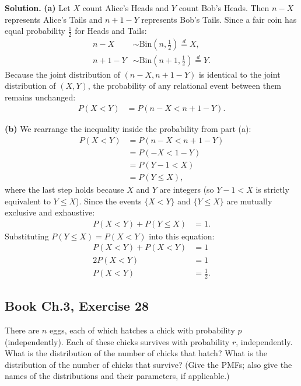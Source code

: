 \documentclass[11pt,a4paper]{article}
\begin{document}
\noindent \textbf{Solution.} \textbf{(a)} Let $X$ count Alice's Heads and $Y$ count Bob's Heads. Then $n - X$ represents Alice's Tails and $n + 1 - Y$ represents Bob's Tails. Since a fair coin has equal probability $\frac{1}{2}$ for Heads and Tails:
\begin{align*}
n - X &\sim \text{Bin}\left(n, \frac{1}{2}\right) \stackrel{d}{=} X, \\
n + 1 - Y &\sim \text{Bin}\left(n+1, \frac{1}{2}\right) \stackrel{d}{=} Y.
\end{align*}
Because the joint distribution of $(n-X, n+1-Y)$ is identical to the joint distribution of $(X, Y)$, the probability of any relational event between them remains unchanged:
\begin{align*}
P(X < Y) &= P(n - X < n + 1 - Y).
\end{align*}

\vspace{4pt}
\noindent \textbf{(b)} We rearrange the inequality inside the probability from part (a):
\begin{align*}
P(X < Y) &= P(n - X < n + 1 - Y) \\
&= P(-X < 1 - Y) \\
&= P(Y - 1 < X) \\
&= P(Y \le X),
\end{align*}
where the last step holds because $X$ and $Y$ are integers (so $Y - 1 < X$ is strictly equivalent to $Y \le X$). Since the events $\{X < Y\}$ and $\{Y \le X\}$ are mutually exclusive and exhaustive:
\begin{align*}
P(X < Y) + P(Y \le X) &= 1.
\end{align*}
Substituting $P(Y \le X) = P(X < Y)$ into this equation:
\begin{align*}
P(X < Y) + P(X < Y) &= 1 \\
2 P(X < Y) &= 1 \\
P(X < Y) &= \frac{1}{2}.
\end{align*}

\vspace{10pt}
\subsection{Book Ch.3, Exercise 28}
\begin{tcolorbox}[title={Book Ch.3, Exercise 28}]
There are $n$ eggs, each of which hatches a chick with probability $p$ (independently). Each of these chicks survives with probability $r$, independently. What is the distribution of the number of chicks that hatch? What is the distribution of the number of chicks that survive? (Give the PMFs; also give the names of the distributions and their parameters, if applicable.)
\end{tcolorbox}
\end{document}
